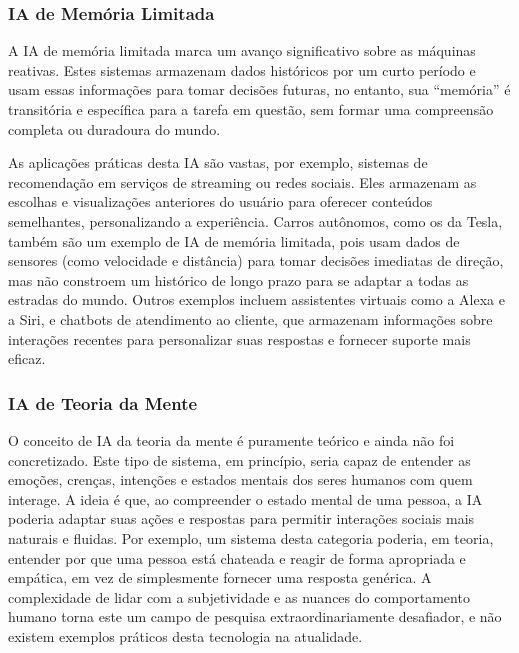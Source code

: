 \subsubsection{IA de Memória Limitada}
A IA de memória limitada marca um avanço significativo sobre as máquinas reativas. Estes sistemas armazenam dados históricos por um curto período e usam essas informações para tomar decisões futuras, no entanto, sua ``memória'' é transitória e específica para a tarefa em questão, sem formar uma compreensão completa ou duradoura do mundo.


As aplicações práticas desta IA são vastas, por exemplo, sistemas de recomendação em serviços de streaming ou redes sociais. Eles armazenam as escolhas e visualizações anteriores do usuário para oferecer conteúdos semelhantes, personalizando a experiência. Carros autônomos, como os da Tesla, também são um exemplo de IA de memória limitada, pois usam dados de sensores (como velocidade e distância) para tomar decisões imediatas de direção, mas não constroem um histórico de longo prazo para se adaptar a todas as estradas do mundo. Outros exemplos incluem assistentes virtuais como a Alexa e a Siri, e chatbots de atendimento ao cliente, que armazenam informações sobre interações recentes para personalizar suas respostas e fornecer suporte mais eficaz.

\subsubsection{IA de Teoria da Mente}
O conceito de IA da teoria da mente é puramente teórico e ainda não foi concretizado. Este tipo de sistema, em princípio, seria capaz de entender as emoções, crenças, intenções e estados mentais dos seres humanos com quem interage. A ideia é que, ao compreender o estado mental de uma pessoa, a IA poderia adaptar suas ações e respostas para permitir interações sociais mais naturais e fluidas. Por exemplo, um sistema desta categoria poderia, em teoria, entender por que uma pessoa está chateada e reagir de forma apropriada e empática, em vez de simplesmente fornecer uma resposta genérica. A complexidade de lidar com a subjetividade e as nuances do comportamento humano torna este um campo de pesquisa extraordinariamente desafiador, e não existem exemplos práticos desta tecnologia na atualidade.

